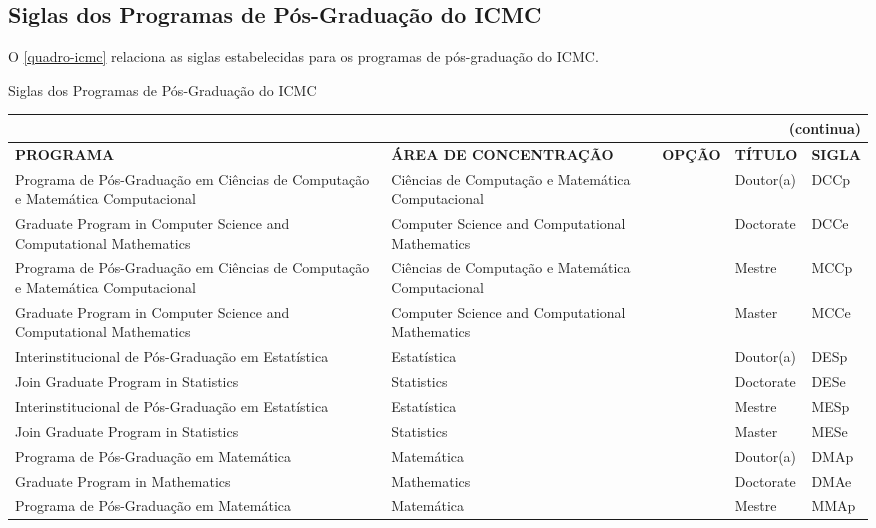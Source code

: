 \begin{apendicesenv}
\chapter{Siglas dos Programas de Pós-Graduação do ICMC}
O \autoref{quadro-icmc} relaciona as siglas estabelecidas para os programas de pós-graduação do ICMC.
\begin{quadro}[htb]
\ABNTEXfontereduzida
\caption[Siglas dos Programas de Pós-Graduação do ICMC]{Siglas dos Programas de Pós-Graduação do ICMC}
\label{quadro-icmc}
\begin{tabular}{|p{3.5cm}|p{3.5cm}|p{2.5cm}|p{2.5cm}|p{2.25cm}|}
  \multicolumn{5}{r}{{(continua)}} \\ 
  \hline
   \textbf{PROGRAMA} & \textbf{ÁREA DE CONCENTRAÇÃO} & \textbf{OPÇÃO} & \textbf{TÍTULO} & \textbf{SIGLA}  \\
    \hline 
		Programa de Pós-Graduação em Ciências de Computação e Matemática Computacional & Ciências de Computação e Matemática Computacional	&   &	Doutor(a)	 & DCCp\\
		Graduate Program in Computer Science and Computational Mathematics & Computer Science and Computational Mathematics	&   &	Doctorate & DCCe\\
	    Programa de Pós-Graduação em Ciências de Computação e Matemática Computacional & Ciências de Computação e Matemática Computacional	&   &	Mestre	& MCCp\\
	    Graduate Program in Computer Science and Computational Mathematics & Computer Science and Computational Mathematics &  & Master & MCCe\\
	    Interinstitucional de Pós-Graduação em Estatística & Estatística &  & Doutor(a)	 & DESp\\
		Join Graduate Program in Statistics & Statistics &  & Doctorate & 	DESe\\
		Interinstitucional de Pós-Graduação em Estatística & Estatística &  & Mestre & MESp\\
		Join Graduate Program in Statistics & Statistics &  & Master & MESe\\
		Programa de Pós-Graduação em Matemática  & Matemática &   &	Doutor(a) & DMAp\\
		Graduate Program in Mathematics & Mathematics &   & Doctorate & DMAe\\
		Programa de Pós-Graduação em Matemática  & Matemática &   &	Mestre & MMAp\\

	\end{tabular}
\end{quadro}


\end{apendicesenv}
